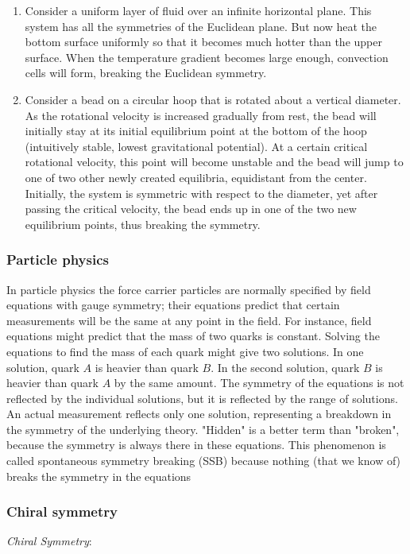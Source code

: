 \begin{enumerate}
	\item Consider a uniform layer of fluid over an infinite horizontal plane. This system has all the symmetries of the Euclidean plane. But now heat the bottom surface uniformly so that it becomes much hotter than the upper surface. When the temperature gradient becomes large enough, convection cells will form, breaking the Euclidean symmetry.
	\item Consider a bead on a circular hoop that is rotated about a vertical diameter. As the rotational velocity is increased gradually from rest, the bead will initially stay at its initial equilibrium point at the bottom of the hoop (intuitively stable, lowest gravitational potential). At a certain critical rotational velocity, this point will become unstable and the bead will jump to one of two other newly created equilibria, equidistant from the center. Initially, the system is symmetric with respect to the diameter, yet after passing the critical velocity, the bead ends up in one of the two new equilibrium points, thus breaking the symmetry.
\end{enumerate}
\subsubsection{Particle physics}
In particle physics the force carrier particles are normally specified by field equations with gauge symmetry; their equations predict that certain measurements will be the same at any point in the field. For instance, field equations might predict that the mass of two quarks is constant. Solving the equations to find the mass of each quark might give two solutions. In one solution, quark $A$ is heavier than quark $B$. In the second solution, quark $B$ is heavier than quark $A$ by the same amount. The symmetry of the equations is not reflected by the individual solutions, but it is reflected by the range of solutions.\\
An actual measurement reflects only one solution, representing a breakdown in the symmetry of the underlying theory. "Hidden" is a better term than "broken", because the symmetry is always there in these equations. This phenomenon is called spontaneous symmetry breaking (SSB) because nothing (that we know of) breaks the symmetry in the equations
\subsubsection{Chiral symmetry}
\label{subsubsec:chiralsymmetry}
\emph{Chiral Symmetry}:\\




